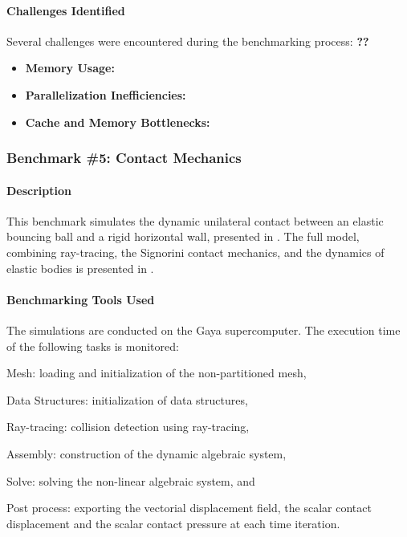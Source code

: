 \paragraph{Challenges Identified}
Several challenges were encountered during the benchmarking process: \textbf{??}
\begin{itemize}
    \item \textbf{Memory Usage:}
    \item \textbf{Parallelization Inefficiencies:}
    \item \textbf{Cache and Memory Bottlenecks:}
\end{itemize}



\subsubsection{Benchmark \#5: Contact Mechanics}

\paragraph{Description}
This benchmark simulates the dynamic unilateral contact between an elastic bouncing
ball and a rigid horizontal wall, presented in \cite{chouly_explicit_2018}. The full model,
combining ray-tracing, the Signorini contact mechanics, and the dynamics of elastic bodies
is presented in \cite{van_landeghem_motion_nodate}. \\


\paragraph{Benchmarking Tools Used}

The simulations are conducted on the Gaya supercomputer. The execution time of the
following tasks is monitored:

\begin{inparaenum}[\it (i)]
    \item Mesh: loading and initialization of the non-partitioned mesh,
    \item Data Structures: initialization of data structures,
    \item Ray-tracing: collision detection using ray-tracing,
    \item Assembly: construction of the dynamic algebraic system,
    \item Solve: solving the non-linear algebraic system, and
    \item Post process: exporting the vectorial displacement field, the scalar contact displacement and the scalar contact pressure at each time iteration.
\end{inparaenum}

